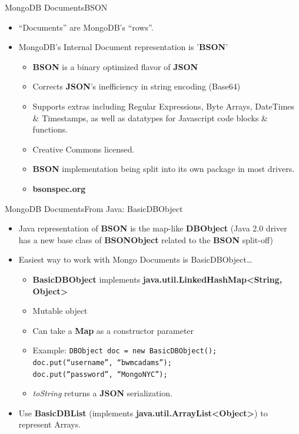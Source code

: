 \documentclass{beamer}
\begin{document}
\begin{frame}{MongoDB Documents}{BSON}
    \begin{itemize}
        \item ``Documents'' are MongoDB's ``rows''. 
        \item MongoDB's Internal Document representation is '{\bf BSON}'
        \begin{itemize}
            \item {\bf BSON} is a binary optimized flavor of {\bf JSON}
            \item Corrects {\bf JSON}'s inefficiency in string encoding (Base64)
            \item Supports extras including Regular Expressions, Byte Arrays, DateTimes \& Timestamps, as well as datatypes for Javascript code blocks \& functions.
            \item Creative Commons licensed.
            \item {\bf BSON} implementation being split into its own package in most drivers.
            \item {\bf bsonspec.org}
        \end{itemize}
    \end{itemize}
\end{frame}

\begin{frame}{MongoDB Documents}{From Java: BasicDBObject}
    \begin{itemize}
        \item Java representation of {\bf BSON} is the map-like {\bf DBObject} (Java 2.0 driver has a new base class of {\bf BSONObject} related to the {\bf BSON} split-off)
        \item Easiest way to work with Mongo Documents is BasicDBObject\dots
            \begin{itemize}
                \item<2-> {\bf BasicDBObject} implements {\bf java.util.LinkedHashMap<String, Object>}
                \item<3-> Mutable object
                \item<4-> Can take a {\bf Map} as a constructor parameter
                \item<5-> Example: 
                    \texttt{\scriptsize DBObject doc = new BasicDBObject();\\
                    doc.put(``username'', ``bwmcadams'');\\
                    doc.put(``password'', ``MongoNYC'');}
                \item<6-> {\em toString} returns a {\bf JSON} serialization.
            \end{itemize}
        \item<7-> Use {\bf BasicDBList} (implements {\bf java.util.ArrayList<Object>}) to represent Arrays.
    \end{itemize}
\end{frame}
\end{document}
